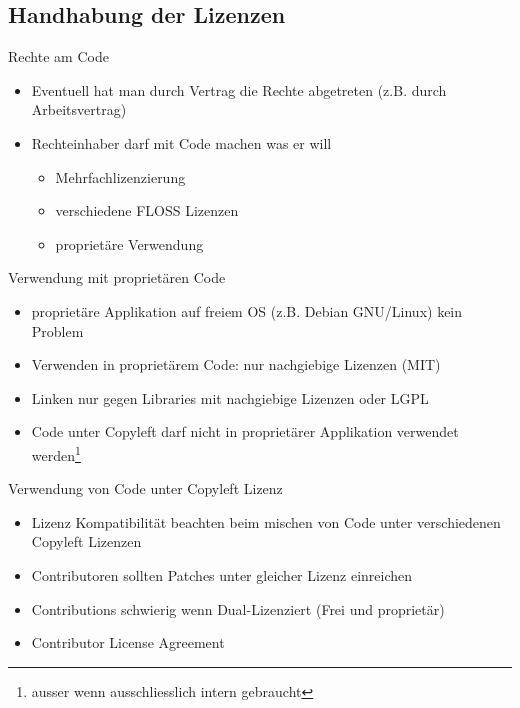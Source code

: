 \subsection{Handhabung der Lizenzen}
\subsectionframe

\begin{frame}{Rechte am Code}
	\begin{itemize}
		\item Eventuell hat man durch Vertrag die Rechte abgetreten (z.B. durch Arbeitsvertrag)
		\item Rechteinhaber darf mit Code machen was er will
		\begin{itemize}
			\item Mehrfachlizenzierung
			\item verschiedene FLOSS Lizenzen
			\item proprietäre Verwendung
		\end{itemize}
	\end{itemize}
\end{frame}

\begin{frame}{Verwendung mit proprietären Code}
	\begin{itemize}
		\item proprietäre Applikation auf freiem OS (z.B. Debian GNU/Linux) kein Problem
		\item Verwenden in proprietärem Code: nur nachgiebige Lizenzen (MIT)
		\item Linken nur gegen Libraries mit nachgiebige Lizenzen oder LGPL
		\item Code unter Copyleft darf nicht in proprietärer Applikation verwendet werden\footnote{ausser wenn ausschliesslich intern gebraucht}
	\end{itemize}
\end{frame}

\begin{frame}{Verwendung von Code unter Copyleft Lizenz}
	\begin{itemize}
		\item Lizenz Kompatibilität beachten beim mischen von Code unter verschiedenen Copyleft Lizenzen
		\item Contributoren sollten Patches unter gleicher Lizenz einreichen
		\item Contributions schwierig wenn Dual-Lizenziert (Frei und proprietär)
		\item Contributor License Agreement
	\end{itemize}
\end{frame}

